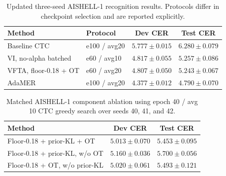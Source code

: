 \begin{table}[t]
  \centering
  \small
  \caption{Updated three-seed AISHELL-1 recognition results. Protocols
  differ in checkpoint selection and are reported explicitly.}
  \label{tab:aishell_updated_recognition}
  \begin{tabular}{llcc}
    \toprule
    Method & Protocol & Dev CER & Test CER \\
    \midrule
    Baseline CTC
      & e100 / avg20
      & $5.777 \pm 0.015$
      & $6.280 \pm 0.079$ \\
    VI, no-alpha batched
      & e60 / avg10
      & $4.817 \pm 0.055$
      & $5.257 \pm 0.086$ \\
    VFTA, floor-0.18 + OT
      & e60 / avg20
      & $4.807 \pm 0.050$
      & $5.243 \pm 0.067$ \\
    AdaMER
      & e100 / avg20
      & $\mathbf{4.377 \pm 0.012}$
      & $\mathbf{4.790 \pm 0.070}$ \\
    \bottomrule
  \end{tabular}
\end{table}

\begin{table}[t]
  \centering
  \small
  \caption{Matched AISHELL-1 component ablation using epoch 40 / avg 10
  CTC greedy search over seeds 40, 41, and 42.}
  \label{tab:aishell_matched_ablation}
  \begin{tabular}{lcc}
    \toprule
    Method & Dev CER & Test CER \\
    \midrule
    Floor-0.18 + prior-KL + OT
      & $\mathbf{5.013 \pm 0.070}$
      & $\mathbf{5.453 \pm 0.095}$ \\
    Floor-0.18 + prior-KL, w/o OT
      & $5.160 \pm 0.036$
      & $5.700 \pm 0.056$ \\
    Floor-0.18 + OT, w/o prior-KL
      & $5.020 \pm 0.061$
      & $5.493 \pm 0.121$ \\
    \bottomrule
  \end{tabular}
\end{table}
